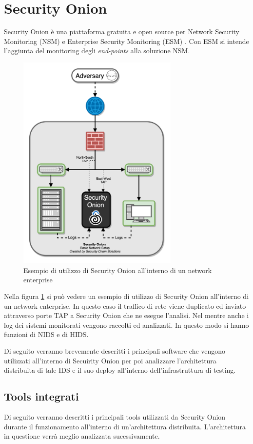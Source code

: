 \section{Security Onion}
Security Onion \cite{secOnion} è   una  piattaforma gratuita e open source per Network Security Monitoring (NSM) e Enterprise Security Monitoring (ESM) \cite{secOnionDoc}.
Con  ESM si intende l'aggiunta del monitoring degli \textit{end-points} alla soluzione NSM.
\begin{figure}[hbtp]
    \centering
    \includegraphics[width=8cm]{res/fig/SecOnionExample1.png}
    \caption{Esempio di utilizzo di Security Onion all'interno di un network enterprise \cite{SecOnionFig1}}
    \label{fig:seconionexample}
\end{figure}

Nella figura \ref{fig:seconionexample} si può vedere un esempio di utilizzo di Security Onion all'interno di un network enterprise.
In questo caso il traffico di rete viene duplicato ed inviato attraverso porte TAP a Security Onion che ne esegue l'analisi. Nel mentre anche i log dei sistemi monitorati vengono raccolti ed analizzati. In questo modo si hanno funzioni di NIDS e di HIDS.

Di seguito verranno brevemente descritti i principali software che vengono utilizzati all'interno di Secuirity Onion per poi analizzare l'architettura distribuita di tale IDS e il suo deploy all'interno dell'infrastruttura di testing.

\subsection{Tools integrati}
Di seguito verranno descritti i principali tools utilizzati da Security Onion durante il funzionamento all'interno di un'architettura distribuita. L'architettura in questione verrà meglio analizzata sucessivamente.
